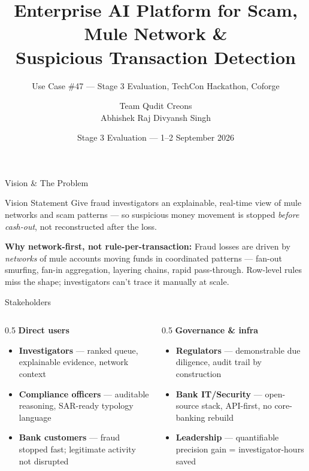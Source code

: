 \documentclass[aspectratio=169]{beamer}
\title[Mule Network Detection --- Stage 3]{Enterprise AI Platform for Scam, Mule Network \& \\ Suspicious Transaction Detection}
\subtitle{Use Case \#47 --- Stage 3 Evaluation, TechCon Hackathon, Coforge}
\author{Team Qudit Creons \\[0.3em] \small Abhishek Raj \quad \textbar\quad Divyansh Singh}
\institute{Coforge --- \#CoforgeTechCon2026 \quad \#CoforgeHackathon}
\date{Stage 3 Evaluation --- 1--2 September 2026}
\begin{document}
\begin{frame}
\titlepage
\end{frame}

\begin{frame}{Vision \& The Problem}
\begin{block}{Vision Statement}
Give fraud investigators an explainable, real-time view of mule networks and scam patterns --- so suspicious money movement is stopped \emph{before cash-out}, not reconstructed after the loss.
\end{block}

\vspace{0.5em}
\textbf{Why network-first, not rule-per-transaction:} Fraud losses are driven by \emph{networks} of mule accounts moving funds in coordinated patterns --- fan-out smurfing, fan-in aggregation, layering chains, rapid pass-through. Row-level rules miss the shape; investigators can't trace it manually at scale.
\end{frame}

\begin{frame}{Stakeholders}
\small
\begin{columns}[T]
\begin{column}{0.5\textwidth}
\textbf{Direct users}
\begin{itemize}
\item \textbf{Investigators} --- ranked queue, explainable evidence, network context
\item \textbf{Compliance officers} --- auditable reasoning, SAR-ready typology language
\item \textbf{Bank customers} --- fraud stopped fast; legitimate activity not disrupted
\end{itemize}
\end{column}
\begin{column}{0.5\textwidth}
\textbf{Governance \& infra}
\begin{itemize}
\item \textbf{Regulators} --- demonstrable due diligence, audit trail by construction
\item \textbf{Bank IT/Security} --- open-source stack, API-first, no core-banking rebuild
\item \textbf{Leadership} --- quantifiable precision gain = investigator-hours saved
\end{itemize}
\end{column}
\end{columns}
\end{frame}
\end{document}
